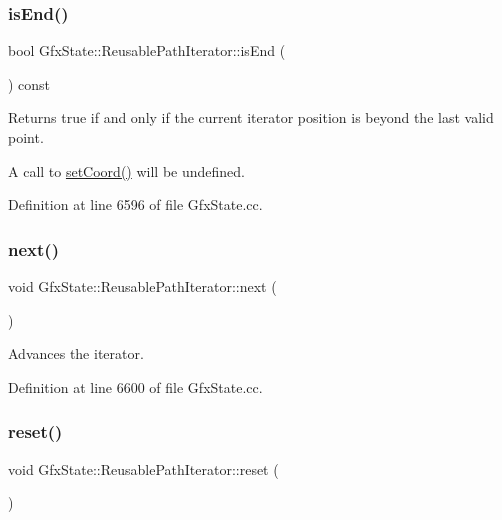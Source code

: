 \subsubsection{\texorpdfstring{is\+End()}{isEnd()}}
{\footnotesize\ttfamily bool Gfx\+State\+::\+Reusable\+Path\+Iterator\+::is\+End (\begin{DoxyParamCaption}{ }\end{DoxyParamCaption}) const}

Returns true if and only if the current iterator position is beyond the last valid point.

A call to \hyperlink{class_gfx_state_1_1_reusable_path_iterator_af4e893977b96e25d14e64d93bb8a76f1}{set\+Coord()} will be undefined. 

Definition at line 6596 of file Gfx\+State.\+cc.

\mbox{\label{class_gfx_state_1_1_reusable_path_iterator_a9ec26361635eb53e8803b38b0ad86cd9}} 
\subsubsection{\texorpdfstring{next()}{next()}}
{\footnotesize\ttfamily void Gfx\+State\+::\+Reusable\+Path\+Iterator\+::next (\begin{DoxyParamCaption}{ }\end{DoxyParamCaption})}

Advances the iterator. 

Definition at line 6600 of file Gfx\+State.\+cc.

\mbox{\label{class_gfx_state_1_1_reusable_path_iterator_a59f8f6d089eb2ae9b0f28e0b7a37342a}} 
\subsubsection{\texorpdfstring{reset()}{reset()}}
{\footnotesize\ttfamily void Gfx\+State\+::\+Reusable\+Path\+Iterator\+::reset (\begin{DoxyParamCaption}{ }\end{DoxyParamCaption})}

